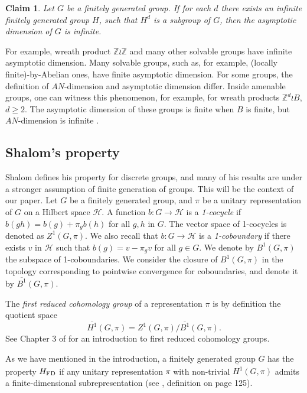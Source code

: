 \documentclass{amsart}
\numberwithin{figure}{section}
\theoremstyle{plain}
\newtheorem{claim}[thm]{Claim}
\theoremstyle{definition}
\begin{document}
\begin{claim}\label{rem:Hd} Let $G$ be a finitely generated group. 
	If for each  $d$ there exists   an infinite finitely generated group $H$, such that $H^d$ is a subgroup of $G$, then the 
	asymptotic dimension of $G$ 
	is infinite. 
\end{claim}
For example, wreath product $\mathbb{Z} \wr \mathbb{Z}$ and many other solvable groups have infinite asymptotic dimension. 
Many solvable groups, such as, for example, (locally finite)-by-Abelian ones, have finite asymptotic dimension. 
For some groups, the definition of $AN$-dimension and asymptotic dimension differ. 
Inside amenable groups, one can witness this phenomenon, for example, for wreath products $\mathbb{Z}^d \wr B$, $d\ge 2$.  The asymptotic dimension of these groups is finite when $B$ is  finite, but $AN$-dimension is infinite \cite{BrodskiyDydakLang}.

\subsection{Shalom's property} \label{subsection:Shalom}
Shalom defines his property for discrete groups, and many of his results are under a stronger assumption of finite generation of groups. This will be the context of our paper.
Let $G$ be a finitely generated group,
and $\pi$ be a unitary representation
of $G$ on a Hilbert space $\mathcal{H}$.
A function $b : G \to \mathcal{H}$ is a {\it 1-cocycle} if
$b(gh) = b(g) + \pi_g b(h)$ for all $g, h$ in $G$.
The vector space of
1-cocycles is denoted as $Z^1(G, \pi)$.
We also recall that 
$b : G \to \mathcal{H}$
is a  {\it 1-coboundary} if there exists $v$ in
$\mathcal{H}$ such that 
$b(g) = v-\pi_g v$ 
for all $g \in G$.
We denote by $B^1(G, \pi)$ the subspace of 1-coboundaries.
We consider the closure of  $B^1(G, \pi)$ in the topology corresponding to 
 pointwise convergence for coboundaries, and denote it  by $\overline{B^1}(G, \pi)$.

The {\it first reduced cohomology group} of a representation $\pi$ is by definition the quotient space
$$
\overline{H^1}(G, \pi) = Z^1(G, \pi)/\overline{B^1}(G, \pi).
$$
See Chapter 3 of \cite{bekkadelaharpevalette} for an introduction to first reduced cohomology groups.


As we have mentioned in the introduction, a finitely generated group $G$ has the property $H_{\rm FD}$ if  any unitary representation $\pi$ with non-trivial
$\overline{H^1}(G, \pi)$ admits a finite-dimensional subrepresentation (see \cite{shalom}, definition on page 125).
\end{document}
